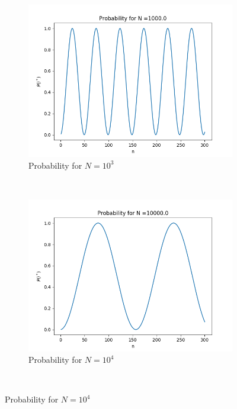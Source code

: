 \documentclass[a4paper,norsk, 10pt]{article}
\begin{document}
\begin{figure}[H]
    \centering
    \begin{subfigure}[b]{0.3\textwidth}
        \includegraphics[width=\textwidth]{P1e3.png}
        \caption{Probability for $N = 10^3$}
        \label{fig:P1e3}
    \end{subfigure}
    ~ %
    \begin{subfigure}[b]{0.3\textwidth}
        \includegraphics[width=\textwidth]{P1e4.png}
        \caption{Probability for $N = 10^4$}
        \label{fig:P1e4}
    \end{subfigure}
    ~ %

\end{figure}
\end{document}
